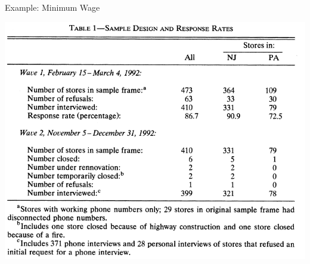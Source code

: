 \begin{frame}{Example: Minimum Wage}

  \includegraphics[width=\textwidth]{./resources/CKSumStats}
\end{frame}
  
